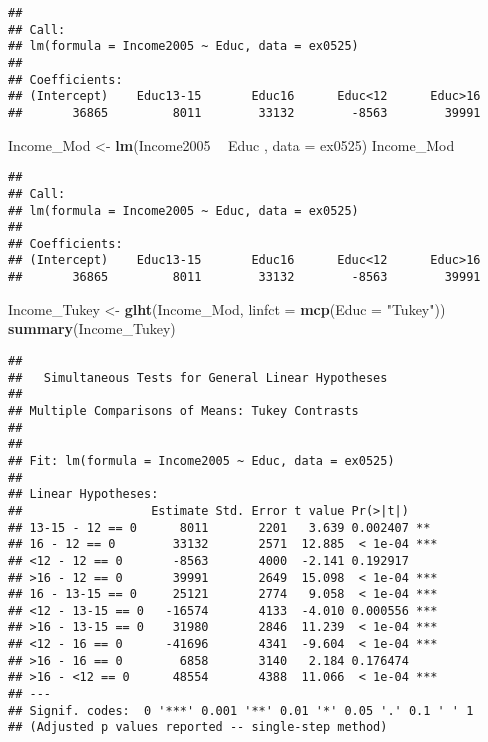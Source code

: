 \documentclass[]{article}
\newenvironment{Shaded}{\begin{snugshade}}{\end{snugshade}}
\newcommand{\KeywordTok}[1]{\textcolor[rgb]{0.13,0.29,0.53}{\textbf{#1}}}
\newcommand{\DataTypeTok}[1]{\textcolor[rgb]{0.13,0.29,0.53}{#1}}
\newcommand{\StringTok}[1]{\textcolor[rgb]{0.31,0.60,0.02}{#1}}
\newcommand{\OperatorTok}[1]{\textcolor[rgb]{0.81,0.36,0.00}{\textbf{#1}}}
\newcommand{\NormalTok}[1]{#1}
\begin{document}
\begin{verbatim}
## 
## Call:
## lm(formula = Income2005 ~ Educ, data = ex0525)
## 
## Coefficients:
## (Intercept)    Educ13-15       Educ16      Educ<12      Educ>16  
##       36865         8011        33132        -8563        39991
\end{verbatim}

\begin{Shaded}
\begin{Highlighting}[]
\NormalTok{Income_Mod <-}\StringTok{ }\KeywordTok{lm}\NormalTok{(Income2005 }\OperatorTok{~}\StringTok{ }\NormalTok{Educ , }\DataTypeTok{data =}\NormalTok{ ex0525)}
\NormalTok{Income_Mod}
\end{Highlighting}
\end{Shaded}

\begin{verbatim}
## 
## Call:
## lm(formula = Income2005 ~ Educ, data = ex0525)
## 
## Coefficients:
## (Intercept)    Educ13-15       Educ16      Educ<12      Educ>16  
##       36865         8011        33132        -8563        39991
\end{verbatim}

\begin{Shaded}
\begin{Highlighting}[]
\NormalTok{Income_Tukey <-}\StringTok{ }\KeywordTok{glht}\NormalTok{(Income_Mod, }\DataTypeTok{linfct =} \KeywordTok{mcp}\NormalTok{(}\DataTypeTok{Educ =} \StringTok{"Tukey"}\NormalTok{))}
\KeywordTok{summary}\NormalTok{(Income_Tukey)}
\end{Highlighting}
\end{Shaded}

\begin{verbatim}
## 
##   Simultaneous Tests for General Linear Hypotheses
## 
## Multiple Comparisons of Means: Tukey Contrasts
## 
## 
## Fit: lm(formula = Income2005 ~ Educ, data = ex0525)
## 
## Linear Hypotheses:
##                  Estimate Std. Error t value Pr(>|t|)    
## 13-15 - 12 == 0      8011       2201   3.639 0.002407 ** 
## 16 - 12 == 0        33132       2571  12.885  < 1e-04 ***
## <12 - 12 == 0       -8563       4000  -2.141 0.192917    
## >16 - 12 == 0       39991       2649  15.098  < 1e-04 ***
## 16 - 13-15 == 0     25121       2774   9.058  < 1e-04 ***
## <12 - 13-15 == 0   -16574       4133  -4.010 0.000556 ***
## >16 - 13-15 == 0    31980       2846  11.239  < 1e-04 ***
## <12 - 16 == 0      -41696       4341  -9.604  < 1e-04 ***
## >16 - 16 == 0        6858       3140   2.184 0.176474    
## >16 - <12 == 0      48554       4388  11.066  < 1e-04 ***
## ---
## Signif. codes:  0 '***' 0.001 '**' 0.01 '*' 0.05 '.' 0.1 ' ' 1
## (Adjusted p values reported -- single-step method)
\end{verbatim}
\end{document}
